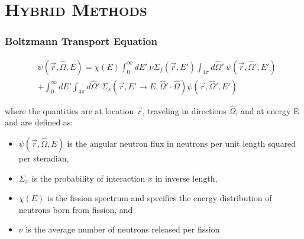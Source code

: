 \documentclass[xcolor=x11names,compress]{beamer}
\renewcommand{\(}{\begin{columns}}
\renewcommand{\)}{\end{columns}}
\newcommand{\<}[1]{\begin{column}{#1}}
\renewcommand{\>}{\end{column}}
\newcommand{\Macro}{\ensuremath{\Sigma}}
\newcommand{\vOmega}{\ensuremath{\hat{\Omega}}}
\begin{document}
\section{\scshape Hybrid Methods}
\begin{frame}[fragile]
  \frametitle{Boltzmann Transport Equation}

\begin{align}
  [\vOmega \cdot \nabla + \Macro(\vec{r}, E)] &\psi(\vec{r}, \vOmega, E)  = \chi(E) \int_0^{\infty} dE' \:\nu \Macro_{f}(\vec{r}, E') \int_{4\pi} d\vOmega' \:\psi(\vec{r}, \vOmega', E')  \nonumber \\
   &+ \int_0^{\infty} dE' \int_{4\pi} d\vOmega' \:\Macro_{s}(\vec{r}, E' \to E, \vOmega' \cdot \vOmega) \psi(\vec{r}, \vOmega', E')  \nonumber
\end{align}

\noindent where the quantities are at location $\vec{r}$, traveling in directions $\hat{\Omega}$, and at energy E and are defined as:
\begin{itemize}
  \item $\psi(\vec{r}, \hat{\Omega}, E)$ is the angular neutron flux in neutrons per unit length squared per steradian, 
  \item $\Sigma_x$ is the probability of interaction $x$ in inverse length,
  \item $\chi(E)$ is the fission spectrum and specifies the energy distribution of neutrons born from fission, and
  \item $\nu$ is the average number of neutrons released per fission 
\end{itemize}

\end{frame}
\end{document}
